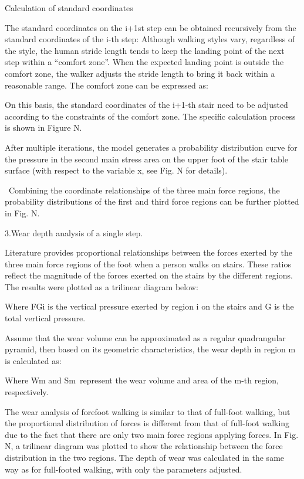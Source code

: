 \documentclass{mcmthesis}
\begin{document}
Calculation of standard coordinates


The standard coordinates on the i+1st step can be obtained recursively from the standard coordinates of the i-th step:
Although walking styles vary, regardless of the style, the human stride length tends to keep the landing point of the next step within a “comfort zone”. When the expected landing point is outside the comfort zone, the walker adjusts the stride length to bring it back within a reasonable range. The comfort zone can be expressed as:

On this basis, the standard coordinates of the i+1-th stair need to be adjusted according to the constraints of the comfort zone. The specific calculation process is shown in Figure N. 

After multiple iterations, the model generates a probability distribution curve for the pressure in the second main stress area on the upper foot of the stair table surface (with respect to the variable x, see Fig. N for details).

 Combining the coordinate relationships of the three main force regions, the probability distributions of the first and third force regions can be further plotted in Fig. N.

3.Wear depth analysis of a single step.

Literature \cite{ WOS:000678697003082}provides proportional relationships between the forces exerted by the three main force regions of the foot when a person walks on stairs. These ratios reflect the magnitude of the forces exerted on the stairs by the different regions. The results were plotted as a trilinear diagram below:


Where FGi is the vertical pressure exerted by region i on the stairs and G is the total vertical pressure.


Assume that the wear volume can be approximated as a regular quadrangular pyramid, then based on its geometric characteristics, the wear depth in region m is calculated as:


Where Wm and Sm represent the wear volume and area of the m-th region, respectively.


The wear analysis of forefoot walking is similar to that of full-foot walking, but the proportional distribution of forces is different from that of full-foot walking due to the fact that there are only two main force regions applying forces. In Fig. N, a trilinear diagram was plotted to show the relationship between the force distribution in the two regions. The depth of wear was calculated in the same way as for full-footed walking, with only the parameters adjusted.
\end{document}
